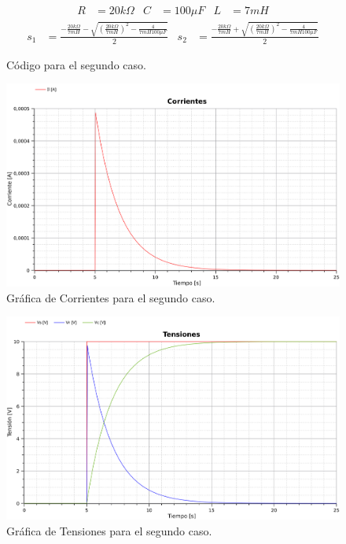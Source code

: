 

\begin{align*}
  R&=20k\Omega&
  C&=100\mu F&
  L&=7mH
\end{align*}
\begin{align*}
  s_1 &= \frac{-\frac{20k\Omega}{7mH}
  - \sqrt{\left(\frac{20k\Omega}{7mH}\right)^2-\frac{4}{7mH100\mu F}}}{2}
  &
  s_2 &= \frac{-\frac{20k\Omega}{7mH}
  + \sqrt{\left(\frac{20k\Omega}{7mH}\right)^2-\frac{4}{7mH100\mu F}}}{2}
\end{align*}


\begin{figure}[H]
  
  \caption{Código para el segundo caso.}
\end{figure}

\begin{figure}[H]
  \centering
  \label{gr:caso1:corrientes}
  \includegraphics[width=\textwidth]{modelica/graficas/2-corrientes}
  \caption{Gráfica de Corrientes para el segundo caso.}
\end{figure}

\begin{figure}[H]
  \centering
  \label{gr:caso1:tensiones}
  \includegraphics[width=\textwidth]{modelica/graficas/2-tensiones}
  \caption{Gráfica de Tensiones para el segundo caso.}
\end{figure}
